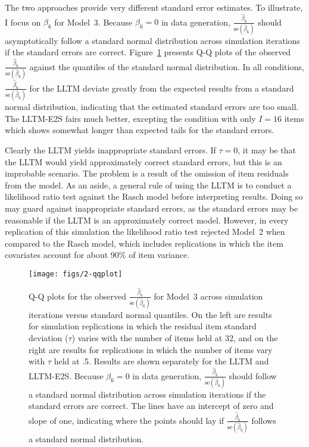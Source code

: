 The two approaches provide very different standard error estimates. To illustrate, I focus on $\beta_6$ for Model~3. Because $\beta_6 = 0$ in data generation,
$\frac{\hat \beta_6}{\mathrm{se}(\hat \beta_6)}$ 
should asymptotically follow a standard normal distribution across simulation iterations if the standard errors are correct. 
Figure~\ref{fig:2-qqplot} presents Q-Q plots of the observed 
$\frac{\hat \beta_6}{\mathrm{se}(\hat \beta_6)}$ 
against the quantiles of the standard normal distribution. In all conditions, 
$\frac{\hat \beta_6}{\mathrm{se}(\hat \beta_6)}$ 
for the LLTM deviate greatly from the expected results from a standard normal distribution, indicating that the estimated standard errors are too small.
The LLTM-E2S fairs much better, excepting the condition with only $I=16$ items which shows somewhat longer than expected tails for the standard errors.

Clearly the LLTM yields inappropriate standard errors. If $\tau = 0$, it may be that the LLTM would yield approximately correct standard errors, but this is an improbable scenario. The problem is a result of the omission of item residuals from the model. As an aside, a general rule of using the LLTM is to conduct a likelihood ratio test against the Rasch model before interpreting results. Doing so may guard against inappropriate standard errors, as the standard errors may be reasonable if the LLTM is an approximately correct model. However, in every replication of this simulation the likelihood ratio test rejected Model~2 when compared to the Rasch model, which includes replications in which the item covariates account for about 90\% of item variance.

\begin{figure}
	\centering
	\texttt{[image: figs/2-qqplot]}
	\caption{Q-Q plots for the observed $\frac{\hat \beta_6}{\mathrm{se}(\hat \beta_6)}$ for Model~3 across simulation iterations versus standard normal quantiles. On the left are results for simulation replications in which the residual item standard deviation ($\tau$) varies with the number of items held at 32, and on the right are results for replications in which the number of items vary with $\tau$ held at .5. Results are shown separately for the LLTM and LLTM-E2S. Because $\beta_6 = 0$ in data generation, $\frac{\hat \beta_6}{\mathrm{se}(\hat \beta_6)}$ should follow a standard normal distribution across simulation iterations if the standard errors are correct. The lines have an intercept of zero and slope of one, indicating where the points should lay if $\frac{\hat \beta_6}{\mathrm{se}(\hat \beta_6)}$ follows a standard normal distribution.}
	\label{fig:2-qqplot}
\end{figure}


